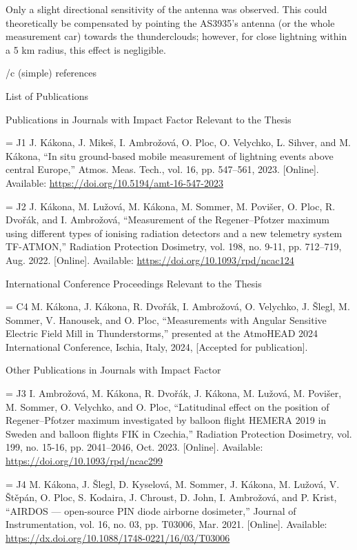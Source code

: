 Only a slight directional sensitivity of the antenna was observed. This could theoretically be compensated by pointing the AS3935’s antenna (or the whole measurement car) towards the thunderclouds; however, for close lightning within a 5 km radius, this effect is negligible.

\bibchap

\usebib/c (simple) references

\app List of Publications

\specialbibs


\secc Publications in Journals with Impact Factor Relevant to the Thesis

\bib[j1] = {J1} J. Kákona, J. Mikeš, I. Ambrožová, O. Ploc, O. Velychko, L. Sihver, and M. Kákona, “In situ ground-based mobile measurement of lightning events above central Europe,” Atmos. Meas. Tech., vol. 16, pp. 547–561, 2023. [Online]. Available: \url{https://doi.org/10.5194/amt-16-547-2023}

\bib[j2] = {J2} J. Kákona, M. Lužová, M. Kákona, M. Sommer, M. Povišer, O. Ploc, R. Dvořák, and I. Ambrožová, “Measurement of the Regener–Pfotzer maximum using different types of ionising radiation detectors and a new telemetry system TF-ATMON,” Radiation Protection Dosimetry, vol. 198, no. 9-11, pp. 712–719, Aug. 2022. [Online]. Available: \url{https://doi.org/10.1093/rpd/ncac124}

\secc International Conference Proceedings Relevant to the Thesis

\bib[c4] = {C4} M. Kákona, J. Kákona, R. Dvořák, I. Ambrožová, O. Velychko, J. Šlegl, M. Sommer, V. Hanousek, and O. Ploc, “Measurements with Angular Sensitive Electric Field Mill in Thunderstorms,” presented at the AtmoHEAD 2024 International Conference, Ischia, Italy, 2024, [Accepted for publication].

\secc Other Publications in Journals with Impact Factor

\bib[j3] = {J3} I. Ambrožová, M. Kákona, R. Dvořák, J. Kákona, M. Lužová, M. Povišer, M. Sommer, O. Velychko, and O. Ploc, “Latitudinal effect on the position of Regener–Pfotzer maximum investigated by balloon flight HEMERA 2019 in Sweden and balloon flights FIK in Czechia,” Radiation Protection Dosimetry, vol. 199, no. 15-16, pp. 2041–2046, Oct. 2023. [Online]. Available: \url{https://doi.org/10.1093/rpd/ncac299}

\bib[j4] = {J4} M. Kákona, J. Šlegl, D. Kyselová, M. Sommer, J. Kákona, M. Lužová, V. Štěpán, O. Ploc, S. Kodaira, J. Chroust, D. John, I. Ambrožová, and P. Krist, “AIRDOS — open-source PIN diode airborne dosimeter,” Journal of Instrumentation, vol. 16, no. 03, pp. T03006, Mar. 2021. [Online]. Available: \url{https://dx.doi.org/10.1088/1748-0221/16/03/T03006}

